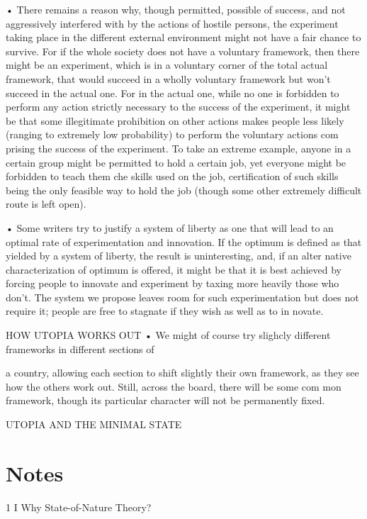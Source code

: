 \documentclass[11pt,openany]{book}
\newcommand{\bookbackmatter}[1]{%
  \clearpage\phantomsection\chapter*{#1}%
  \addcontentsline{toc}{chapter}{#1}\markboth{#1}{#1}\thispagestyle{plain}}
\begin{document}
{• There remains a reason why, though permitted, possible of success, and not aggressively interfered with by the actions of hostile persons, the experiment taking place in the different external environment might not have a fair chance to survive. For if the whole society does not have a voluntary framework, then there might be an experiment, which is in a voluntary corner of the total actual framework, that would succeed in a wholly voluntary framework but won't succeed in the actual one. For in the actual one, while no one is forbidden to perform any action strictly necessary to the success of the experiment, it might be that some illegitimate prohibition on other actions makes people less likely (ranging to extremely low probability) to perform the voluntary actions com prising the success of the experiment. To take an extreme example, anyone in a certain group might be permitted to hold a certain job, yet everyone might be forbidden to teach them che skills used on the job, certification of such skills being the only feasible way to hold the job (though some other extremely difficult route is left open).\par

• Some writers try to justify a system of liberty as one that will lead to an optimal rate of experimentation and innovation. If the optimum is defined as that yielded by a system of liberty, the result is uninteresting, and, if an alter native characterization of optimum is offered, it might be that it is best achieved by forcing people to innovate and experiment by taxing more heavily those who don't. The system we propose leaves room for such experimentation but does not require it; people are free to stagnate if they wish as well as to in novate.\par

HOW UTOPIA WORKS OUT • We might of course try slighcly different frameworks in different sections of\par

a country, allowing each section to shift slightly their own framework, as they see how the others work out. Still, across the board, there will be some com mon framework, though its particular character will not be permanently fixed.\par

UTOPIA AND THE MINIMAL STATE\par

}

\bookbackmatter{Notes}

1 I Why State-of-Nature Theory? 
\end{document}
